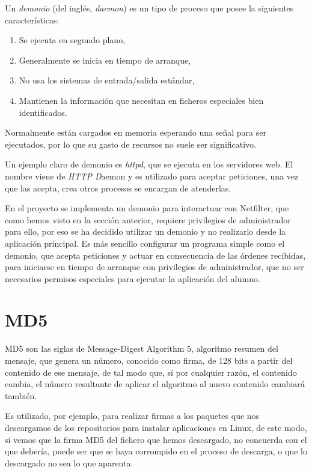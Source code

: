Un \emph{demonio} (del inglés, \emph{daemon}\cite{SO:2006}) es un tipo de proceso que posee la siguientes características:

\begin{enumerate}
	\item Se ejecuta en segundo plano,
	\item Generalmente se inicia en tiempo de arranque,
	\item No usa los sistemas de entrada/salida est\'andar,
	\item Mantienen la información que necesitan en ficheros especiales bien identificados.
\end{enumerate}

Normalmente est\'an cargados en memoria esperando una señal para ser ejecutados, por lo que su gasto de recursos no suele ser significativo.
\newline


Un ejemplo claro de demonio es \emph{httpd}, que se ejecuta en los servidores web. El nombre viene de \emph{HTTP D}aemon y es utilizado para aceptar peticiones, una vez que las acepta, crea otros procesos se encargan de atenderlas.
\newline

En el proyecto se implementa un demonio para interactuar con Netfilter, que como hemos visto en la sección anterior, requiere privilegios de administrador para ello, por eso se ha decidido utilizar un demonio y no realizarlo desde la aplicación principal. Es más sencillo configurar un programa simple como el demonio, que acepta peticiones y actuar en consecuencia de las órdenes recibidas, para iniciarse en tiempo de arranque con privilegios de administrador, que no ser necesarios permisos especiales para ejecutar la aplicación del alumno.


\section{MD5}

MD5\cite{MD5:2007} son las siglas de Message-Digest Algorithm 5, algoritmo resumen del mensaje, que genera un número, conocido como firma, de 128 bits a partir del contenido de ese mensaje, de tal modo que, sí por cualquier razón, el contenido cambia, el número resultante de aplicar el algoritmo al nuevo contenido cambiará también.
\newline

Es utilizado, por ejemplo, para realizar firmas a los paquetes que nos descargamos de los repositorios para instalar aplicaciones en Linux, de este modo, si vemos que la firma MD5 del fichero que hemos descargado, no concuerda con el que debería, puede ser que se haya corrompido en el proceso de descarga, o que lo descargado no sea lo que aparenta.
\newline


